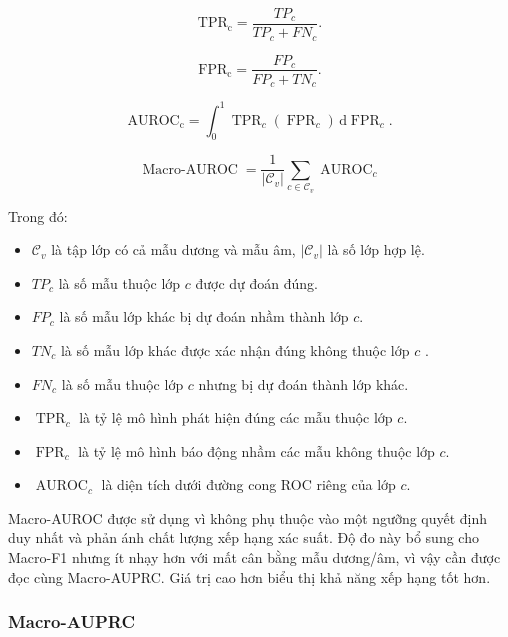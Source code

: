 \begin{equation}
    \operatorname{TPR_c}=\frac{TP_c}{TP_c+FN_c}.
\end{equation}

\begin{equation}
    \operatorname{FPR_c}=\frac{FP_c}{FP_c+TN_c}.
\end{equation}

\begin{equation}
    \operatorname{AUROC_c}=\int_{0}^{1}\operatorname{TPR}_{c}(\operatorname{FPR}_{c})\,\mathrm{d}\operatorname{FPR}_{c}.
\end{equation}

\begin{equation}\operatorname{Macro\text{-}AUROC}=\frac{1}{\left|\mathcal{C}_{v}\right|}\sum_{c\in\mathcal{C}_{v}}\operatorname{AUROC}_{c}\label{eq:ch4_macro_auroc}\end{equation}

Trong đó:
\begin{itemize}
    \item $\mathcal{C}_{v}$ là tập lớp có cả mẫu dương và mẫu âm, $|\mathcal{C}_{v}|$ là số lớp hợp lệ.
    \item $TP_c$ là số mẫu thuộc lớp $c$ được dự đoán đúng.
    \item $FP_c$ là số mẫu lớp khác bị dự đoán nhầm thành lớp $c$.
    \item $TN_c$ là số mẫu lớp khác được xác nhận đúng không thuộc lớp $c$ .
    \item $FN_c$ là số mẫu thuộc lớp $c$ nhưng bị dự đoán thành lớp khác.
    \item $\operatorname{TPR}_{c}$ là tỷ lệ mô hình phát hiện đúng các mẫu thuộc lớp $c$.
    \item $\operatorname{FPR}_{c}$ là tỷ lệ mô hình báo động nhầm các mẫu không thuộc lớp $c$.
    \item $\operatorname{AUROC}_{c}$ là diện tích dưới đường cong ROC riêng của lớp $c$.
\end{itemize}

Macro-AUROC được sử dụng vì không phụ thuộc vào một ngưỡng quyết định duy nhất và phản ánh chất lượng xếp hạng xác suất. Độ đo này bổ sung cho Macro-F1 nhưng ít nhạy hơn với mất cân bằng mẫu dương/âm, vì vậy cần được đọc cùng Macro-AUPRC. Giá trị cao hơn biểu thị khả năng xếp hạng tốt hơn.

\subsubsection{Macro-AUPRC}

